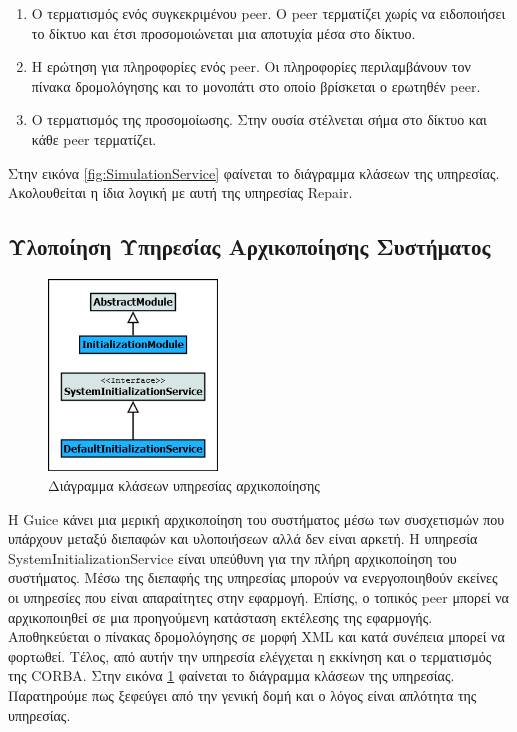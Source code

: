 \begin{enumerate}
\item Ο τερματισμός ενός συγκεκριμένου peer. Ο peer τερματίζει χωρίς να 
ειδοποιήσει το δίκτυο και έτσι προσομοιώνεται μια αποτυχία μέσα στο 
δίκτυο.
\item Η ερώτηση για πληροφορίες ενός peer. Οι πληροφορίες περιλαμβάνουν 
τον πίνακα δρομολόγησης και το μονοπάτι στο οποίο βρίσκεται ο ερωτηθέν 
peer.
\item Ο τερματισμός της προσομοίωσης. Στην ουσία στέλνεται σήμα στο 
δίκτυο και κάθε peer τερματίζει.
\setcounter{numberedCntBB}{\theenumi}
\end{enumerate}
Στην εικόνα \ref{fig:SimulationService} φαίνεται το διάγραμμα κλάσεων 
της υπηρεσίας. Ακολουθείται η ίδια λογική με αυτή της υπηρεσίας Repair.

\subsection{Υλοποίηση Υπηρεσίας Αρχικοποίησης Συστήματος}

\begin{figure}
  \begin{center}
    \includegraphics[width=0.40\textwidth]{Figures/Architecture/Service_Layer/InitializationService_ClassDiagram.png}
  \end{center}
  \caption{Διάγραμμα κλάσεων υπηρεσίας αρχικοποίησης}
  \label{fig:InitService}
\end{figure}

Η Guice κάνει μια μερική αρχικοποίηση του συστήματος μέσω των 
συσχετισμών που υπάρχουν μεταξύ διεπαφών και υλοποιήσεων αλλά δεν είναι 
αρκετή. Η υπηρεσία SystemInitializationService είναι υπεύθυνη για την 
πλήρη αρχικοποίηση του συστήματος. Μέσω της διεπαφής της υπηρεσίας 
μπορούν να ενεργοποιηθούν εκείνες οι υπηρεσίες που είναι απαραίτητες 
στην εφαρμογή. Επίσης, ο τοπικός peer μπορεί να αρχικοποιηθεί σε μια 
προηγούμενη κατάσταση εκτέλεσης της εφαρμογής. Αποθηκεύεται ο πίνακας 
δρομολόγησης σε μορφή XML και κατά συνέπεια μπορεί να φορτωθεί. Τέλος, 
από αυτήν την υπηρεσία ελέγχεται η εκκίνηση και ο τερματισμός της CORBA. 
Στην εικόνα \ref{fig:InitService} φαίνεται το διάγραμμα κλάσεων της υπηρεσίας. 
Παρατηρούμε πως ξεφεύγει από την γενική δομή και ο λόγος είναι απλότητα 
της υπηρεσίας.

